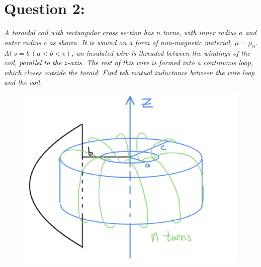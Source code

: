 \documentclass[12pt]{article}
\begin{document}
\section*{Question 2:}
\emph{A toroidal coil with rectangular cross section has $n$ turns, with inner radius $a$ and outer radius $c$ as shown. It is wound on a form of non-magnetic material, $\mu = \mu_0$. At $s=b \, (a<b<c)$, an insulated wire is threaded between the windings of the coil, parallel to the $z$-axis. The rest of this wire is formed into a continuous loop, which closes outside the toroid. Find teh mutual inductance between the wire loop and the coil.}
\begin{figure}[h]
\centering
\includegraphics[scale=.5]{exam02_question2.png}
\label{fig:2.1}
\end{figure}

\newpage
\end{document}
